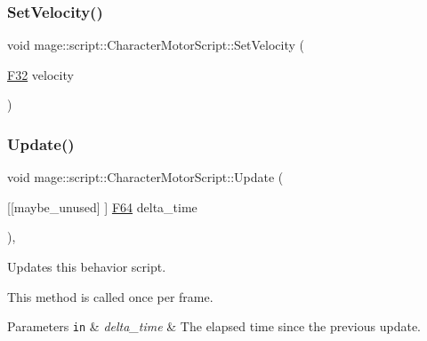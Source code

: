 \hypertarget{classmage_1_1script_1_1_character_motor_script_a51c9b8317670fc0ae554bfb0cac11aee}{}\label{classmage_1_1script_1_1_character_motor_script_a51c9b8317670fc0ae554bfb0cac11aee} 
\subsubsection{\texorpdfstring{Set\+Velocity()}{SetVelocity()}}
{\footnotesize\ttfamily void mage\+::script\+::\+Character\+Motor\+Script\+::\+Set\+Velocity (\begin{DoxyParamCaption}\item[{\hyperlink{namespacemage_aa97e833b45f06d60a0a9c4fc22ae02c0}{F32}}]{velocity }\end{DoxyParamCaption})\hspace{0.3cm}{\ttfamily [noexcept]}}

\hypertarget{classmage_1_1script_1_1_character_motor_script_a75683c4b8db184174b48dd7e4989c016}{}\label{classmage_1_1script_1_1_character_motor_script_a75683c4b8db184174b48dd7e4989c016} 
\subsubsection{\texorpdfstring{Update()}{Update()}}
{\footnotesize\ttfamily void mage\+::script\+::\+Character\+Motor\+Script\+::\+Update (\begin{DoxyParamCaption}\item[{\mbox{[}\mbox{[}maybe\+\_\+unused\mbox{]} \mbox{]} \hyperlink{namespacemage_ad26233bbec640deda836e572c1a23708}{F64}}]{delta\+\_\+time }\end{DoxyParamCaption})\hspace{0.3cm}{\ttfamily [override]}, {\ttfamily [virtual]}}

Updates this behavior script.

This method is called once per frame.


\begin{DoxyParams}[1]{Parameters}
\mbox{\tt in}  & {\em delta\+\_\+time} & The elapsed time since the previous update. \\
\hline
\end{DoxyParams}

